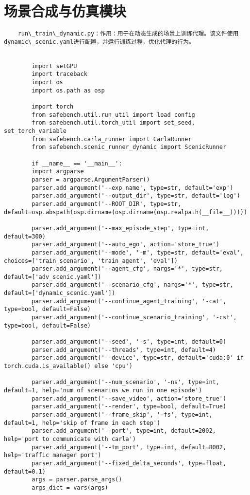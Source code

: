 \section*{场景合成与仿真模块}
\begin{lstlisting}
	run\_train\_dynamic.py：作用：用于在动态生成的场景上训练代理。该文件使用dynamic\_scenic.yaml进行配置，并运行训练过程，优化代理的行为。


		import setGPU
		import traceback
		import os
		import os.path as osp
		
		import torch 
		from safebench.util.run_util import load_config
		from safebench.util.torch_util import set_seed, set_torch_variable
		from safebench.carla_runner import CarlaRunner
		from safebench.scenic_runner_dynamic import ScenicRunner
		
		if __name__ == '__main__':
		import argparse
		parser = argparse.ArgumentParser()
		parser.add_argument('--exp_name', type=str, default='exp')
		parser.add_argument('--output_dir', type=str, default='log')
		parser.add_argument('--ROOT_DIR', type=str, default=osp.abspath(osp.dirname(osp.dirname(osp.realpath(__file__)))))
		
		parser.add_argument('--max_episode_step', type=int, default=300)
		parser.add_argument('--auto_ego', action='store_true')
		parser.add_argument('--mode', '-m', type=str, default='eval', choices=['train_scenario', 'train_agent', 'eval'])
		parser.add_argument('--agent_cfg', nargs='*', type=str, default=['adv_scenic.yaml'])
		parser.add_argument('--scenario_cfg', nargs='*', type=str, default=['dynamic_scenic.yaml'])
		parser.add_argument('--continue_agent_training', '-cat', type=bool, default=False)
		parser.add_argument('--continue_scenario_training', '-cst', type=bool, default=False)
		
		parser.add_argument('--seed', '-s', type=int, default=0)
		parser.add_argument('--threads', type=int, default=4)
		parser.add_argument('--device', type=str, default='cuda:0' if torch.cuda.is_available() else 'cpu')   
		
		parser.add_argument('--num_scenario', '-ns', type=int, default=1, help='num of scenarios we run in one episode')
		parser.add_argument('--save_video', action='store_true')
		parser.add_argument('--render', type=bool, default=True)
		parser.add_argument('--frame_skip', '-fs', type=int, default=1, help='skip of frame in each step')
		parser.add_argument('--port', type=int, default=2002, help='port to communicate with carla')
		parser.add_argument('--tm_port', type=int, default=8002, help='traffic manager port')
		parser.add_argument('--fixed_delta_seconds', type=float, default=0.1)
		args = parser.parse_args()
		args_dict = vars(args)
		

\end{lstlisting}
